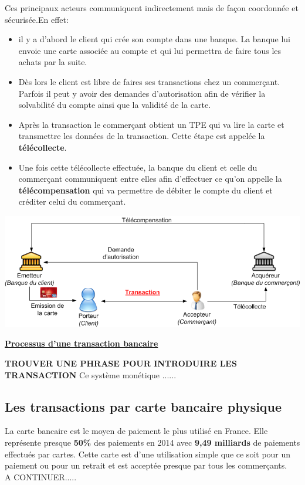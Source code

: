 \documentclass[12pt]{report}
\begin{document}
Ces principaux acteurs communiquent indirectement mais de façon coordonnée et sécurisée.En effet: 

\begin{itemize}
    \item il y a d'abord le client qui crée son compte dans une banque. La banque lui envoie une carte associée au compte et qui lui permettra de faire tous les achats par la suite.
    \item Dès lors le client est libre de faires ses transactions chez un commerçant. Parfois il peut y avoir des demandes d'autorisation afin de vérifier la solvabilité du compte ainsi que la validité de la carte.
    \item Après la transaction le commerçant obtient un TPE qui va lire la carte et transmettre les données de la transaction. Cette étape est appelée la \textbf{télécollecte}. 
    \item Une fois cette télécollecte effectuée, la banque du client et celle du commerçant communiquent entre elles afin d'effectuer ce qu'on appelle la \textbf{télécompensation} qui va permettre de débiter le compte du client et créditer celui du commerçant. \\[1cm]
\end{itemize}

\includegraphics[width=1\textwidth]{process_transaction}
\begin{center}
   \textbf{\underline{Processus d'une transaction bancaire}} \\[1cm]
\end{center}

\textbf{TROUVER UNE PHRASE POUR INTRODUIRE LES TRANSACTION}
\hspace{1cm} Ce système monétique ...... 

    \subsection{Les transactions par carte bancaire physique}
\hspace{1cm} La carte bancaire est le moyen de paiement le plus utilisé en France. Elle représente presque \textbf{50\%} des paiements en 2014 avec \textbf{9,49 milliards} de paiements effectués par cartes. Cette carte est d'une utilisation simple que ce soit pour un paiement ou pour un retrait et est acceptée presque par tous les commerçants. \\ A CONTINUER.....
\end{document}

